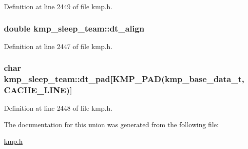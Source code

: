 Definition at line 2449 of file kmp.\-h.

\hypertarget{unionkmp__sleep__team_ad34e877662b70f6d5aad13b5b6017be6}{
\subsubsection[{dt\-\_\-align}]{\setlength{\rightskip}{0pt plus 5cm}double kmp\-\_\-sleep\-\_\-team\-::dt\-\_\-align}}\label{unionkmp__sleep__team_ad34e877662b70f6d5aad13b5b6017be6}


Definition at line 2447 of file kmp.\-h.

\hypertarget{unionkmp__sleep__team_abbdb5b123a4f5b5eff4f55983ad1fa43}{
\subsubsection[{dt\-\_\-pad}]{\setlength{\rightskip}{0pt plus 5cm}char kmp\-\_\-sleep\-\_\-team\-::dt\-\_\-pad\mbox{[}{\bf K\-M\-P\-\_\-\-P\-A\-D}({\bf kmp\-\_\-base\-\_\-data\-\_\-t}, {\bf C\-A\-C\-H\-E\-\_\-\-L\-I\-N\-E})\mbox{]}}}\label{unionkmp__sleep__team_abbdb5b123a4f5b5eff4f55983ad1fa43}


Definition at line 2448 of file kmp.\-h.



The documentation for this union was generated from the following file\-:\begin{DoxyCompactItemize}
\item 
\hyperlink{kmp_8h}{kmp.\-h}\end{DoxyCompactItemize}
